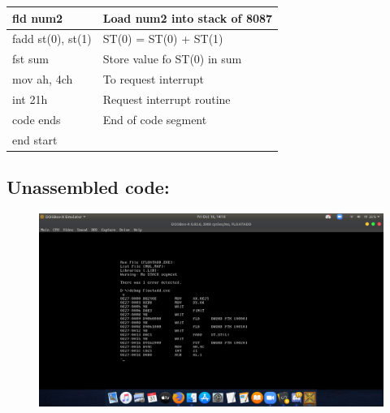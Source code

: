 \documentclass[10pt,a4paper]{article}
\begin{document}
\begin{flushleft}
\begin{table}[htb]
{\begin{tabular}{|l|l|}
\hline
fld num2                                                         & Load num2 into stack of 8087                  \\
\hline
fadd st(0), st(1)                                                & ST(0) = ST(0) + ST(1)                         \\
\hline
fst sum                                                          & Store value fo ST(0) in sum                   \\
\hline
mov ah, 4ch                                                      & To request interrupt                          \\
\hline
int 21h                                                          & Request interrupt routine                     \\ 
\hline
code ends                                                        & End of code segment                           \\
\hline
end start                                                        &                                               \\
\hline
\end{tabular}
}
\end{table}

\newpage
\subsection*{\textbf{Unassembled code:}}
\begin{figure}[h]
    \centering
    \includegraphics[trim = 100mm 60mm 200mm 110mm, clip, width = \textwidth]{Pics/FAUS.png}
\end{figure}

\end{flushleft}
\end{document}
